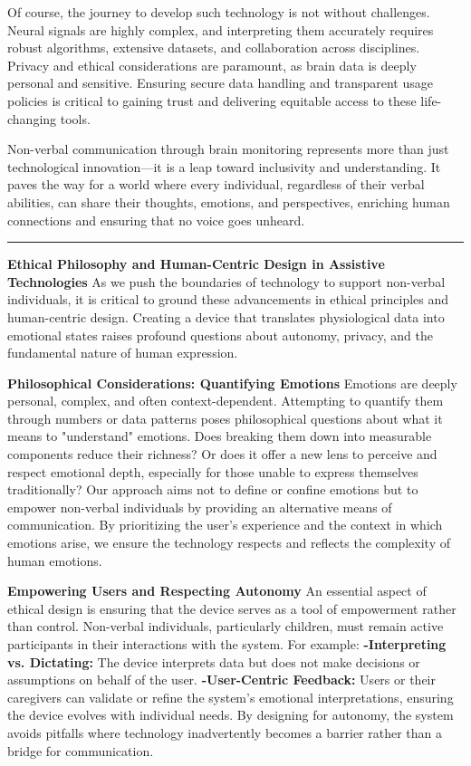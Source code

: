 \documentclass[12pt, research paper]{report}
\begin{document}
	\noindent Of course, the journey to develop such technology is not without challenges. Neural signals are highly complex, and interpreting them accurately requires robust algorithms, extensive datasets, and collaboration across disciplines. Privacy and ethical considerations are paramount, as brain data is deeply personal and sensitive. Ensuring secure data handling and transparent usage policies is critical to gaining trust and delivering equitable access to these life-changing tools.
	\bigskip
	
	\noindent Non-verbal communication through brain monitoring represents more than just technological innovation—it is a leap toward inclusivity and understanding. It paves the way for a world where every individual, regardless of their verbal abilities, can share their thoughts, emotions, and perspectives, enriching human connections and ensuring that no voice goes unheard.
	
	\noindent \rule{13.85cm}{0.01cm}
	\noindent \textbf{Ethical Philosophy and Human-Centric Design in Assistive Technologies}
	\newline As we push the boundaries of technology to support non-verbal individuals, it is critical to ground these advancements in ethical principles and human-centric design. Creating a device that translates physiological data into emotional states raises profound questions about autonomy, privacy, and the fundamental nature of human expression.
	\bigskip 
	
	\noindent \textbf{Philosophical Considerations: Quantifying Emotions}
	\newline Emotions are deeply personal, complex, and often context-dependent. Attempting to quantify them through numbers or data patterns poses philosophical questions about what it means to "understand" emotions. Does breaking them down into measurable components reduce their richness? Or does it offer a new lens to perceive and respect emotional depth, especially for those unable to express themselves traditionally? Our approach aims not to define or confine emotions but to empower non-verbal individuals by providing an alternative means of communication. By prioritizing the user’s experience and the context in which emotions arise, we ensure the technology respects and reflects the complexity of human emotions.
	\bigskip 
	
	\noindent \textbf{Empowering Users and Respecting Autonomy}
	\newline An essential aspect of ethical design is ensuring that the device serves as a tool of empowerment rather than control. Non-verbal individuals, particularly children, must remain active participants in their interactions with the system. For example:
	\newline \textbf{-Interpreting vs. Dictating:} The device interprets data but does not make decisions or assumptions on behalf of the user.
	\newline \textbf{-User-Centric Feedback:} Users or their caregivers can validate or refine the system’s emotional interpretations, ensuring the device evolves with individual needs.
	By designing for autonomy, the system avoids pitfalls where technology inadvertently becomes a barrier rather than a bridge for communication.
	
\end{document}
